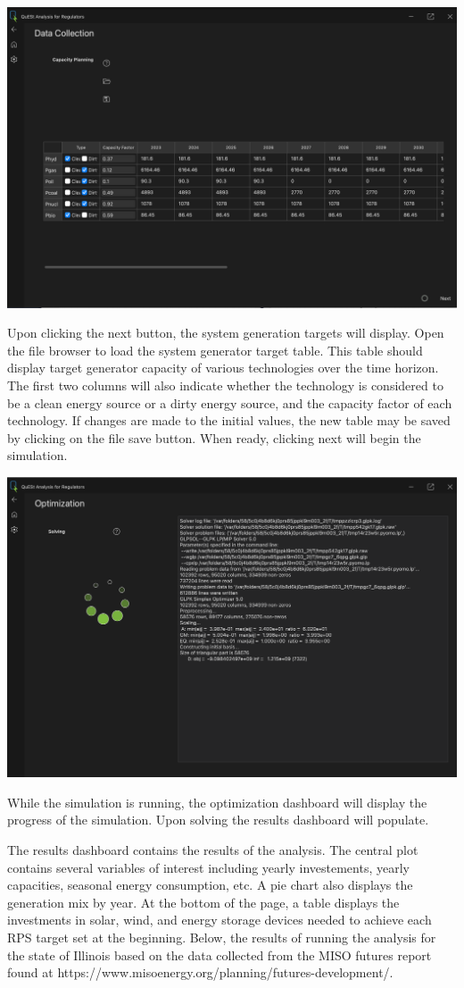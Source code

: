 \documentclass{article}
\begin{document}
\begin{center}
    \includegraphics[width=0.8\linewidth]{pics/gen_caps.png}
\end{center}
Upon clicking the next button, the system generation targets will display. Open the file browser to load the system generator target table. This table should display target generator capacity of various technologies over the time horizon. The first two columns will also indicate whether the technology is considered to be a clean energy source or a dirty energy source, and the capacity factor of each technology. If changes are made to the initial values, the new table may be saved by clicking on the file save button. When ready, clicking next will begin the simulation.

\begin{center}
    \includegraphics[width=0.8\linewidth]{pics/opt.png}
\end{center}
While the simulation is running, the optimization dashboard will display the progress of the simulation. Upon solving the results dashboard will populate.

The results dashboard contains the results of the analysis. The central plot contains several variables of interest including yearly investements, yearly capacities, seasonal energy consumption, etc. A pie chart also displays the generation mix by year. At the bottom of the page, a table displays the investments in solar, wind, and energy storage devices needed to achieve each RPS target set at the beginning. Below, the results of running the analysis for the state of Illinois based on the data collected from the MISO futures report found at https://www.misoenergy.org/planning/futures-development/.
\end{document}
